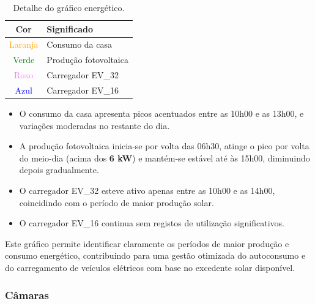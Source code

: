 \begin{table}[H]
\centering
\begin{tabular}{|c|l|}
\hline
\textbf{Cor} & \textbf{Significado} \\
\hline
\textcolor{orange}{Laranja} & Consumo da casa \\
\textcolor{green}{Verde} & Produção fotovoltaica \\
\textcolor{violet}{Roxo} & Carregador EV\_32 \\
\textcolor{blue}{Azul} & Carregador EV\_16 \\
\hline
\end{tabular}
\caption{Detalhe do gráfico energético.}
\label{tab:cores_consumo_producao}
\end{table}

\vspace{1em}

\begin{flushleft}
\vspace{-\baselineskip} %
\begin{itemize}[itemsep=0pt, parsep=0pt, partopsep=0pt, topsep=0pt, leftmargin=*]
  \item O consumo da casa apresenta picos acentuados entre as 10h00 e as 13h00, e variações moderadas no restante do dia.
  \item A produção fotovoltaica inicia-se por volta das 06h30, atinge o pico por volta do meio-dia (acima dos \textbf{6 kW}) e mantém-se estável até às 15h00, diminuindo depois gradualmente.
  \item O carregador EV\_32 esteve ativo apenas entre as 10h00 e as 14h00, coincidindo com o período de maior produção solar.
  \item O carregador EV\_16 continua sem registos de utilização significativos.
\end{itemize}
\end{flushleft}




Este gráfico permite identificar claramente os períodos de maior produção e consumo energético, contribuindo para uma gestão otimizada do autoconsumo e do carregamento de veículos elétricos com base no excedente solar disponível.

\subsubsection{Câmaras}

